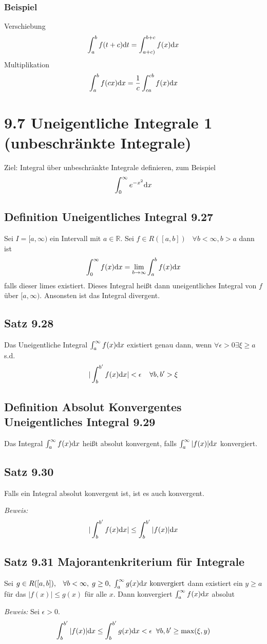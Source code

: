 \documentclass[]{scrartcl}
\begin{document}
\subsubsection{Beispiel}
Verschiebung
$$
\int_a^b f(t+c)\text dt = \int_{a+c)}^{b+c}f(x)\text dx
$$
Multiplikation
$$
\int_a^b f(cx)\text dx = \frac{1}{c}\int_{ca}^{cb} f(x)\text dx
$$

\section{9.7 Uneigentliche Integrale 1 (unbeschränkte Integrale)}
Ziel: Integral über unbeschränkte Integrale definieren, zum Beispiel
$$
\int_0^\infty e^{-x^2}\text dx 
$$
\subsection{Definition Uneigentliches Integral 9.27}
Sei $I = [a,\infty)$ ein Intervall mit $a\in\mathbb R$. Sei $f\in R([a,b]) \;\;\; \forall b<\infty, b>a$
dann ist
$$
\int_0^\infty f(x)\text dx = \lim_{b\rightarrow\infty}\int_a^b f(x)\text dx
$$
falls dieser limes existiert. Dieses Integral heißt dann uneigentliches Integral von $f$ über $[a,\infty)$. Ansonsten ist das Integral divergent.

\subsection{Satz 9.28}
Das Uneigentliche Integral $\int_a^\infty f(x)\text dx$ existiert genau dann, wenn $\forall \epsilon>0 \exists \xi \geq a$ s.d.
$$
|\int_b^{b'} f(x) \text dx| < \epsilon \;\;\;\; \forall b,b' > \xi
$$

\subsection{Definition Absolut Konvergentes Uneigentliches Integral 9.29}

Das Integral $\int_a^\infty f(x)\text dx$ heißt absolut konvergent, falls $\int_a^\infty |f(x)|\text dx$ konvergiert.

\subsection{Satz 9.30}
Falls ein Integral absolut konvergent ist, ist es auch konvergent.

\textit{Beweis: }
$$
|\int_b^{b'} f(x) \text dx| \leq \int_b^{b'}|f(x)|\text dx
$$

\subsection{Satz 9.31 Majorantenkriterium für Integrale}
Sei $g\in R([a,b]),\;\;\;\forall b<\infty,\; g\geq 0,\; \int_a^\infty g(x)\text dx\text{ konvergiert}$
dann existiert ein $y\geq a$ für das $|f(x)|\leq g(x)$ für alle $x$. Dann konvergiert $\int_a^\infty f(x) \text dx$ absolut

\textit{Beweis:} Sei $\epsilon >0$.
\begin{gather*}
	\int_b^{b'}|f(x)|\text dx \leq \int_b^{b'}g(x)\text dx < \epsilon \;\; \forall b,b' \geq \text{max}(\xi,y)
\end{gather*}
\end{document}
